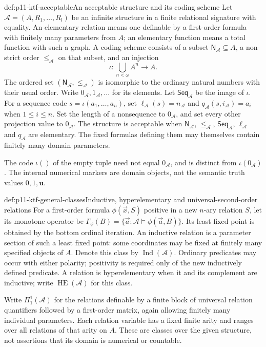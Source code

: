 \begin{hbdefinition}{def:p11-ktf-acceptable}{An acceptable structure and its coding scheme}
Let \(\mathcal A=(A,R_1,\ldots,R_l)\) be an infinite structure
in a finite relational signature with equality. An elementary relation
means one definable by a first-order formula with finitely many
parameters from \(A\); an elementary function means a total function
with such a graph. A coding scheme consists of a subset
\(\mathsf N_{\mathcal A}\subseteq A\), a non-strict order
\(\leq_{\mathcal A}\) on that subset, and an injection
\[
 \iota:\bigcup_{n<\omega}A^n\longrightarrow A.
\]
The ordered set \((\mathsf N_{\mathcal A},\leq_{\mathcal A})\)
is isomorphic to the ordinary natural numbers with their usual order.
Write \(0_{\mathcal A},1_{\mathcal A},\ldots\) for its elements.
Let \(\mathsf{Seq}_{\mathcal A}\) be the image of \(\iota\).
For a sequence code \(s=\iota(a_1,\ldots,a_n)\), set
\(\ell_{\mathcal A}(s)=n_{\mathcal A}\) and
\(q_{\mathcal A}(s,i_{\mathcal A})=a_i\) when \(1\leq i\leq n\).
Set the length of a nonsequence to \(0_{\mathcal A}\), and set
every other projection value to \(0_{\mathcal A}\).
The structure is acceptable when \(\mathsf N_{\mathcal A}\),
\(\leq_{\mathcal A}\), \(\mathsf{Seq}_{\mathcal A}\),
\(\ell_{\mathcal A}\) and \(q_{\mathcal A}\) are elementary.
The fixed formulas defining them may themselves contain finitely
many domain parameters.

The code \(\iota()\) of the empty tuple need not equal
\(0_{\mathcal A}\), and is distinct from \(\iota(0_{\mathcal A})\).
The internal numerical markers are domain objects, not the semantic
truth values \(0,1,\mathbf u\).
\end{hbdefinition}

\begin{hbdefinition}{def:p11-ktf-general-classes}{Inductive, hyperelementary and universal-second-order relations}
For a first-order formula \(\phi(\vec x,S)\) positive in a
new \(n\)-ary relation \(S\), let its monotone operator be
\(\Gamma_\phi(B)=\{\vec a:\mathcal A\models\phi(\vec a,B)\}\).
Its least fixed point is obtained by the bottom ordinal iteration.
An inductive relation is a parameter section of such a least fixed
point: some coordinates may be fixed at finitely many specified
objects of \(A\). Denote this class by \(\operatorname{Ind}(\mathcal A)\).
Ordinary predicates may occur with either polarity; positivity is
required only of the new inductively defined predicate. A relation is
hyperelementary when it and its complement are inductive; write
\(\operatorname{HE}(\mathcal A)\) for this class.

Write \(\Pi^1_1(\mathcal A)\) for the relations definable by
a finite block of universal relation quantifiers followed by a
first-order matrix, again allowing finitely many individual parameters.
Each relation variable has a fixed finite arity and ranges over all
relations of that arity on \(A\). These are classes over the given
structure, not assertions that its domain is numerical or countable.
\end{hbdefinition}


